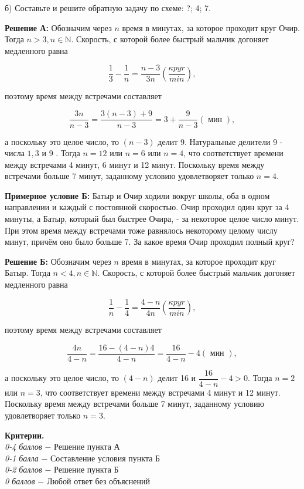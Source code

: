 б) Составьте и решите обратную задачу по схеме: ?; 4; 7.

\textbf{Решение А:} Обозначим через $n$ время в минутах, за которое проходит круг Очир. Тогда $n>3, n \in \mathbb{N}$. Скорость, с которой более быстрый мальчик догоняет медленного равна

$$
\frac{1}{3}-\frac{1}{n}=\frac{n-3}{3 n}\left(\frac{\kappa p y r}{min}\right),
$$


поэтому время между встречами составляет

$$
\frac{3 n}{n-3}=\frac{3(n-3)+9}{n-3}=3+\frac{9}{n-3}(\text { мин }),
$$


а поскольку это целое число, то $(n-3)$ делит 9. Натуральные делители 9 - числа $1 , 3$ и 9 . Тогда $n=12$ или $n=6$ или $n=4$, что соответствует времени между встречами 4 минут, 6 минут и 12 минут. Поскольку время между встречами больше 7 минут, заданному условию удовлетворяет только $n=4$.



\textbf{Примерное условие Б:} Батыр и Очир ходили вокруг школы, оба в одном направлении и каждый с постоянной скоростью. Очир проходил один круг за 4 минуты, а Батыр, который был быстрее Очира, - за некоторое целое число минут. При этом время между встречами тоже равнялось некоторому целому числу минут, причём оно было больше 7. За какое время Очир проходил полный круг?

\textbf{Решение Б:} Обозначим через $n$ время в минутах, за которое проходит круг Батыр. Тогда $n<4, n \in \mathbb{N}$. Скорость, с которой более быстрый мальчик догоняет медленного равна

$$
\frac{1}{n}-\frac{1}{4}=\frac{4-n}{4 n}\left(\frac{\kappa p y r}{min}\right),
$$


поэтому время между встречами составляет

$$
\frac{4 n}{4-n}=\frac{16-(4-n)4}{4-n}=\frac{16}{4-n}-4(\text { мин }),
$$


а поскольку это целое число, то $(4-n)$ делит 16 и $\dfrac{16}{4-n}-4>0$. Тогда $n=2$ или $n=3$, что соответствует времени между встречами 4 минут и 12 минут. Поскольку время между встречами больше 7 минут, заданному условию удовлетворяет только $n=3$.

\textbf{Критерии.} \\
\textit{0-4 баллов} $-$ Решение пункта А\\
\textit{0-1 балла} $-$ Составление условия пункта Б \\
\textit{0-2 баллов} $-$ Решение пункта Б\\
\textit{0 баллов} $-$ Любой ответ без объяснений\\


